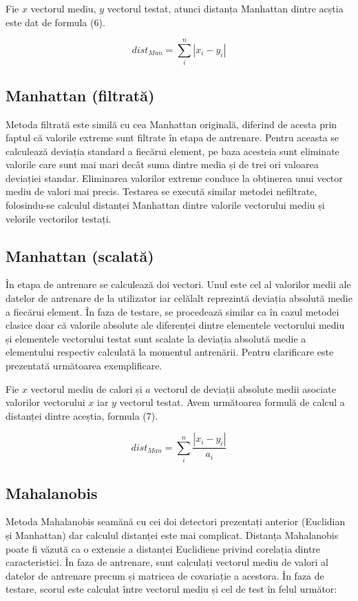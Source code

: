 \documentclass[9pt,shortpaper,twoside,web]{ieeecolor}
\begin{document}
		Fie $x$ vectorul mediu, $y$ vectorul testat, atunci distanța Manhattan dintre acștia este dat de formula (6).
		
\begin{equation}  \label{eq6}
	dist_{Man} = \sum\limits_{i}^n |x_i - y_i|
\end{equation}

\subsection{Manhattan (filtrată)}
	Metoda filtrată este similă cu cea Manhattan originală, diferind de acesta prin faptul că valorile extreme sunt filtrate în etapa de antrenare.  Pentru aceasta se calculează deviația standard a fiecărui element, pe baza acesteia sunt eliminate valorile care sunt mai mari decât suma dintre media și de trei ori valoarea deviației standar. Eliminarea valorilor extreme conduce la obținerea unui vector mediu de valori mai precis. Testarea se execută similar metodei nefiltrate, folosindu-se calculul distanței Manhattan dintre valorile vectorului mediu și velorile vectorilor testați.

\subsection{Manhattan (scalată)}
	În etapa de antrenare se calculează doi vectori. Unul este cel al valorilor medii ale datelor de antrenare de la utilizator iar celălalt reprezintă deviația absolută medie a fiecărui element. În faza de testare, se procedează similar ca în cazul metodei clasice doar că valorile absolute ale diferenței dintre elementele vectorului mediu și elementele vectorului testat sunt scalate la deviația absolută medie a elementului respectiv calculată la momentul antrenării. Pentru clarificare este prezentată următoarea exemplificare.
	
	Fie $x$ vectorul mediu de calori și $a$ vectorul de deviații absolute medii asociate valorilor vectorului $x$ iar $y$ vectorul testat. Avem următoarea formulă de calcul a distanței dintre aceștia, formula (7).
	 
\begin{equation}  \label{eq7}
	dist_{Man} = \sum\limits_{i}^n \frac{|x_i - y_i|}{a_i}
\end{equation}
	
\subsection{Mahalanobis}
	Metoda Mahalanobis seamănă cu cei doi detectori prezentați anterior (Euclidian și Manhattan) dar calculul distanței este mai complicat. Distanța Mahalanobis poate fi văzută ca o extensie a distanței Euclidiene privind corelația dintre caracteristici. În faza de antrenare, sunt calculați vectorul mediu de valori al datelor de antrenare precum și matricea de covariație a acestora. În faza de testare, scorul este calculat între vectorul mediu și cel de test în felul următor:
	
\end{document}
